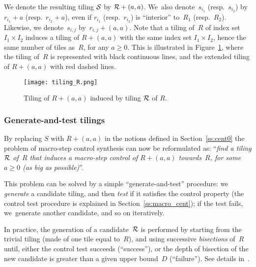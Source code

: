 We denote the resulting tiling ${\cal S}$ by ${\cal R}+(a,a)$.
We~also denote~$s_{i_1}$ (resp.~$s_{i_2}$)
by~$r_{i_1}+a$ (resp.~$r_{i_2}+a$), even if 
$r_{i_1}$ (resp.~$r_{i_2}$) is ``interior'' to~$R_1$
(resp.~$R_2$).
Likewise, we denote~$s_{i,j}$ by~$r_{i,j}+(a,a)$.
%
Note that a tiling of~$R$ of index set $I_1\times I_2$
induces a tiling of $R+(a,a)$ with the same index set
$I_1\times I_2$, hence the same number of tiles as~$R$, for any $a\geq 0$.
This is illustrated in Figure~\ref{fig:tiling2},
where the tiling of~$R$ is represented with black continuous lines,
and the extended tiling of $R+(a,a)$ with red dashed lines.

\begin{figure}[!h]
  \centering
 \texttt{[image: tiling\_R.png]}
  \caption{Tiling of $R+(a,a)$ induced by tiling ${\cal R}$ of $R$.}
 \label{fig:tiling2}
\end{figure}

\subsubsection{Generate-and-test tilings}\label{ss:gen}
By replacing $S$ with $R+(a,a)$ in the notions defined in
Section~\ref{ss:cent0} %
the problem of macro-step control synthesis can now be reformulated as:
``\emph{find a tiling ${\cal R}$ of~$R$ 
that induces a macro-step 
control of $R+(a,a)$  towards~$R$,  for some $a\geq 0$ (as big as possible)}''.


This problem can be solved by a simple ``generate-and-test''
procedure: we \emph{generate} a candidate tiling, and then 
\emph{test} if it satisfies the control property (the control test
procedure is explained in Section~\ref{ss:macro_cent}); if the test
fails, we~generate another candidate, and so on iteratively.

In practice, the generation of a candidate~${\cal R}$ is performed
by starting from the trivial tiling (made of one tile equal to~$R$), and
using successive \emph{bisections} of~$R$ until, either the control
test succeeds (``success''), or the depth of bisection of the new
candidate is greater than a given upper bound~$D$ (``failure'').  See
details in~\cite{fribourg2014finite}.%


